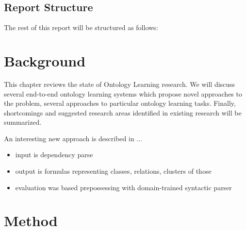 \documentclass[a4paper]{report}
\begin{document}
\section{Report Structure}

The rest of this report will be structured as follows:

\chapter{Background}

This chapter reviews the state of Ontology Learning research.
We will discuss several end-to-end ontology learning systems which propose novel approaches to the problem, several approaches to particular ontology learning tasks.
Finally, shortcomings and suggested research areas identified in existing research will be summarized.

An interesting new approach is described in \cite{Poon2010OntoUSP}...
\begin{itemize}
  \item{input is dependency parse}
  \item{output is formulas representing classes, relations, clusters of those}
  \item{evaluation was based prepossessing with domain-trained syntactic parser}
\end{itemize}

\chapter{Method}
\end{document}
